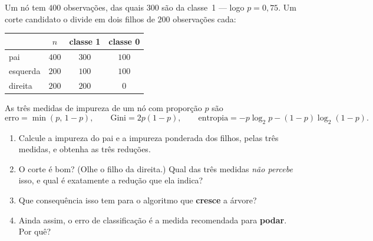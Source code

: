 \documentclass[11pt,a4paper]{article}
\begin{document}

\begin{exercicio}
Um nó tem $400$ observações, das quais $300$ são da classe~1 --- logo
$p=0{,}75$. Um corte candidato o divide em dois filhos de $200$ observações
cada:
\begin{center}\small
\renewcommand{\arraystretch}{1.3}
\begin{tabular}{@{}lccc@{}}
\toprule
        & $n$ & classe 1 & classe 0 \\
\midrule
pai     & $400$ & $300$ & $100$ \\
esquerda& $200$ & $100$ & $100$ \\
direita & $200$ & $200$ & $0$ \\
\bottomrule
\end{tabular}
\end{center}
As três medidas de impureza de um nó com proporção $p$ são
\[
  \text{erro} = \min(p,\,1-p), \qquad
  \text{Gini} = 2p(1-p), \qquad
  \text{entropia} = -p\log_2 p - (1-p)\log_2(1-p).
\]
\begin{enumerate}[label=(\alph*),leftmargin=1.1cm]
  \item Calcule a impureza do pai e a impureza ponderada dos filhos, pelas três
        medidas, e obtenha as três reduções.
  \item O corte é bom? (Olhe o filho da direita.) Qual das três medidas
        \emph{não percebe} isso, e qual é exatamente a redução que ela indica?
  \item Que consequência isso tem para o algoritmo que \textbf{cresce} a árvore?
  \item Ainda assim, o erro de classificação é a medida recomendada para
        \textbf{podar}. Por quê?
\end{enumerate}
\end{exercicio}
\end{document}

